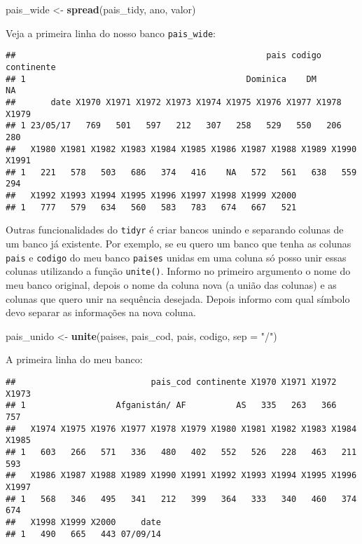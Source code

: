 \documentclass[]{book}
\newenvironment{Shaded}{\begin{snugshade}}{\end{snugshade}}
\newcommand{\DataTypeTok}[1]{\textcolor[rgb]{0.13,0.29,0.53}{#1}}
\newcommand{\KeywordTok}[1]{\textcolor[rgb]{0.13,0.29,0.53}{\textbf{#1}}}
\newcommand{\NormalTok}[1]{#1}
\newcommand{\StringTok}[1]{\textcolor[rgb]{0.31,0.60,0.02}{#1}}
\theoremstyle{definition}
\theoremstyle{definition}
\theoremstyle{definition}
\theoremstyle{remark}
\begin{document}
\begin{Shaded}
\begin{Highlighting}[]
\NormalTok{pais_wide <-}\StringTok{ }\KeywordTok{spread}\NormalTok{(pais_tidy, ano, valor)}
\end{Highlighting}
\end{Shaded}

Veja a primeira linha do nosso banco \texttt{pais\_wide}:

\begin{verbatim}
##                                                  pais codigo continente
## 1                                            Dominica    DM          NA
##       date X1970 X1971 X1972 X1973 X1974 X1975 X1976 X1977 X1978 X1979
## 1 23/05/17   769   501   597   212   307   258   529   550   206   280
##   X1980 X1981 X1982 X1983 X1984 X1985 X1986 X1987 X1988 X1989 X1990 X1991
## 1   221   578   503   686   374   416    NA   572   561   638   559   294
##   X1992 X1993 X1994 X1995 X1996 X1997 X1998 X1999 X2000
## 1   777   579   634   560   583   783   674   667   521
\end{verbatim}

Outras funcionalidades do \texttt{tidyr} é criar bancos unindo e separando colunas de um banco já existente. Por exemplo, se eu quero um banco que tenha as colunas \texttt{pais} e \texttt{codigo} do meu banco \texttt{paises} unidas em uma coluna só posso unir essas colunas utilizando a função \texttt{unite()}. Informo no primeiro argumento o nome do meu banco original, depois o nome da coluna nova (a união das colunas) e as colunas que quero unir na sequência desejada. Depois informo com qual símbolo devo separar as informações na nova coluna.

\begin{Shaded}
\begin{Highlighting}[]
\NormalTok{pais_unido <-}\StringTok{ }\KeywordTok{unite}\NormalTok{(paises, pais_cod, pais, codigo, }\DataTypeTok{sep =} \StringTok{"/"}\NormalTok{)}
\end{Highlighting}
\end{Shaded}

A primeira linha do meu banco:

\begin{verbatim}
##                           pais_cod continente X1970 X1971 X1972 X1973
## 1                  Afganistán/ AF          AS   335   263   366   757
##   X1974 X1975 X1976 X1977 X1978 X1979 X1980 X1981 X1982 X1983 X1984 X1985
## 1   603   266   571   336   480   402   552   526   228   463   211   593
##   X1986 X1987 X1988 X1989 X1990 X1991 X1992 X1993 X1994 X1995 X1996 X1997
## 1   568   346   495   341   212   399   364   333   340   460   374   674
##   X1998 X1999 X2000     date
## 1   490   665   443 07/09/14
\end{verbatim}
\end{document}
